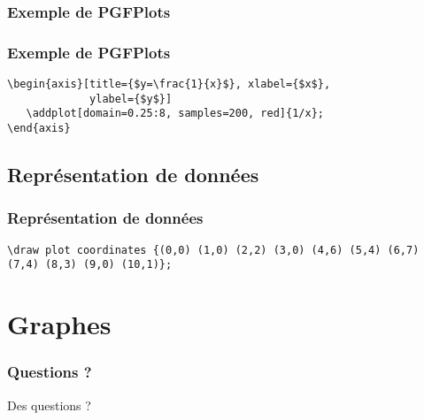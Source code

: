 \documentclass{clic_latex_beamer}
\begin{document}
\begin{frame}[fragile]
\frametitle{Exemple de PGFPlots}


\end{frame}

\begin{frame}[fragile]
\frametitle{Exemple de PGFPlots}

\begin{lstlisting}
\begin{axis}[title={$y=\frac{1}{x}$}, xlabel={$x$},
             ylabel={$y$}]
   \addplot[domain=0.25:8, samples=200, red]{1/x};
\end{axis}
\end{lstlisting}

\end{frame}


\subsection{Représentation de données}
\begin{frame}[fragile]
\frametitle{Représentation de données}

\begin{lstlisting}
\draw plot coordinates {(0,0) (1,0) (2,2) (3,0) (4,6) (5,4) (6,7) (7,4) (8,3) (9,0) (10,1)};
\end{lstlisting}


\end{frame}



\section{Graphes}
\begin{frame}[fragile]
\frametitle{}

\end{frame}
  
 
 
\begin{frame}
\frametitle{Questions ?}
\begin{center}
\Huge Des questions ?
\end{center}
\end{frame}
\end{document}
